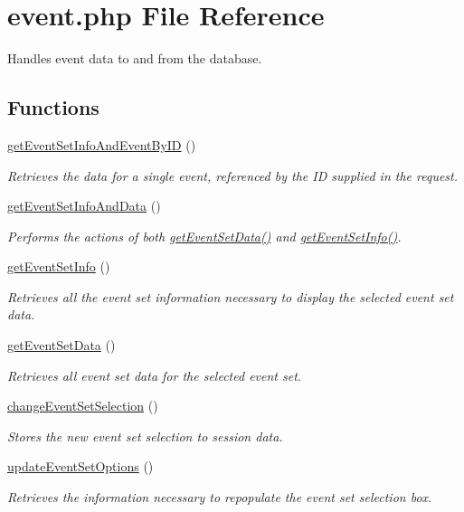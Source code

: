 \hypertarget{event_8php}{\section{event.\-php \-File \-Reference}
\label{event_8php}
}


\-Handles event data to and from the database.  


\subsection*{\-Functions}
\begin{DoxyCompactItemize}
\item 
\hyperlink{event_8php_a64e52607180419f5ac4ce6969f9a3725}{get\-Event\-Set\-Info\-And\-Event\-By\-I\-D} ()
\begin{DoxyCompactList}\small\item\em \-Retrieves the data for a single event, referenced by the \-I\-D supplied in the request. \end{DoxyCompactList}\item 
\hyperlink{event_8php_af3071b0c5bbd23339216eff1dd218349}{get\-Event\-Set\-Info\-And\-Data} ()
\begin{DoxyCompactList}\small\item\em \-Performs the actions of both \hyperlink{event_8php_a7e9028ad62a69bbcf78178653228b348}{get\-Event\-Set\-Data()} and \hyperlink{event_8php_ac111287cb3782ef6b2b3a5c5333a0164}{get\-Event\-Set\-Info()}. \end{DoxyCompactList}\item 
\hyperlink{event_8php_ac111287cb3782ef6b2b3a5c5333a0164}{get\-Event\-Set\-Info} ()
\begin{DoxyCompactList}\small\item\em \-Retrieves all the event set information necessary to display the selected event set data. \end{DoxyCompactList}\item 
\hyperlink{event_8php_a7e9028ad62a69bbcf78178653228b348}{get\-Event\-Set\-Data} ()
\begin{DoxyCompactList}\small\item\em \-Retrieves all event set data for the selected event set. \end{DoxyCompactList}\item 
\hyperlink{event_8php_a13aad0d75556ac9ae9f50ee754bd36f5}{change\-Event\-Set\-Selection} ()
\begin{DoxyCompactList}\small\item\em \-Stores the new event set selection to session data. \end{DoxyCompactList}\item 
\hyperlink{event_8php_a93eabb06ba8025e80af7dde1341c758d}{update\-Event\-Set\-Options} ()
\begin{DoxyCompactList}\small\item\em \-Retrieves the information necessary to repopulate the event set selection box. \end{DoxyCompactList}\end{DoxyCompactItemize}


